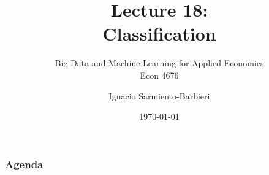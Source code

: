 \documentclass[
  shownotes,
  xcolor={svgnames},
  hyperref={colorlinks,citecolor=DarkBlue,linkcolor=DarkRed,urlcolor=DarkBlue}
  , aspectratio=169]{beamer}
\begin{document}
 
\title[Lecture 18]{Lecture 18: \\ Classification}
\subtitle{Big Data and Machine Learning for Applied Economics \\ Econ 4676}
\date{\today}

\author[Sarmiento-Barbieri]{Ignacio Sarmiento-Barbieri}


\begin{frame}[noframenumbering]
\maketitle
\end{frame}





\begin{frame}
\frametitle{Agenda}

\tableofcontents

\end{frame}

\end{document}
